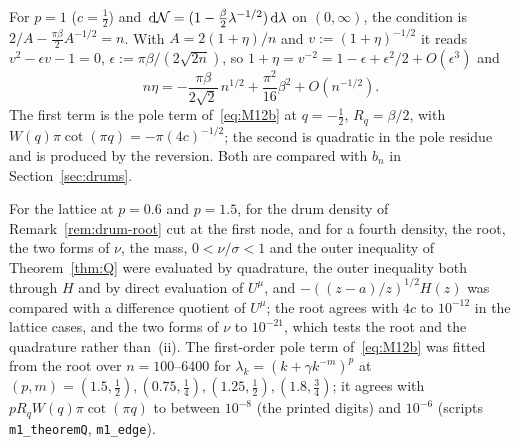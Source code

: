 \begin{remark}\label{rem:drum-root}
For $p=1$ ($c=\frac12$) and $\,\mathrm{d}\mathcal N=(1-\frac\beta2\lambda^{-1/2})\,\mathrm{d}\lambda$ on $(0,\infty)$, the condition is
$2/A-\frac{\pi\beta}2A^{-1/2}=n$. With $A=2(1+\eta)/n$ and $v:=(1+\eta)^{-1/2}$ it reads $v^2-\epsilon v-1=0$,
$\epsilon:=\pi\beta/(2\sqrt{2n})$, so $1+\eta=v^{-2}=1-\epsilon+\epsilon^2/2+O(\epsilon^3)$ and
\[
  n\eta=-\frac{\pi\beta}{2\sqrt2}\,n^{1/2}+\frac{\pi^2}{16}\beta^2+O(n^{-1/2}).
\]
The first term is the pole term of~\eqref{eq:M12b} at $q=-\frac12$, $R_q=\beta/2$, with $W(q)\pi\cot(\pi q)=-\pi(4c)^{-1/2}$;
the second is quadratic in the pole residue and is produced by the reversion. Both are compared with $b_n$ in
Section~\ref{sec:drums}.
\end{remark}

\begin{remark}\label{rem:Q-checks}
For the lattice at $p=0.6$ and $p=1.5$, for the drum density of Remark~\ref{rem:drum-root} cut at the first node, and for a
fourth density, the root, the two forms of $\nu$, the mass, $0<\nu/\sigma<1$ and the outer inequality of
Theorem~\ref{thm:Q} were evaluated by quadrature, the outer inequality both through $H$ and by direct evaluation of
$U^\mu$, and $-((z-a)/z)^{1/2}H(z)$ was compared with a difference quotient of $U^\mu$; the root agrees with $4c$ to $10^{-12}$ in the lattice cases, and the
two forms of $\nu$ to $10^{-21}$, which tests the root and the quadrature rather than~(ii). The first-order pole term
of~\eqref{eq:M12b} was fitted from the root over $n=100$--$6400$ for $\lambda_k=(k+\gamma k^{-m})^p$ at
$(p,m)=(1.5,\frac12),(0.75,\frac14),(1.25,\frac12),(1.8,\frac34)$; it agrees with $pR_qW(q)\pi\cot(\pi q)$ to between
$10^{-8}$ (the printed digits) and $10^{-6}$ (scripts \texttt{m1\_theoremQ}, \texttt{m1\_edge}).
\end{remark}
